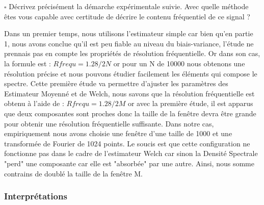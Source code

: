 \documentclass{article}
\newcommand{\finrep}{\vspace*{5mm}\hfill $\square$\color{black}\vspace*{5mm}}
\begin{document}
\finrep
\newpage
Décrivez précisément la démarche expérimentale suivie. Avec quelle méthode êtes vous capable avec certitude de décrire le contenu fréquentiel de ce signal ?\newline

Dans un premier temps, nous utilisons l'estimateur simple car bien qu'en partie 1, nous avons conclue qu'il est peu fiable au niveau du biais-variance, l'étude ne prennais pas en compte les propriétés de résolution fréquentielle. Or dans son cas, la formule est : $ Rfrequ = 1.28/2N $ or pour un N de 10000 nous obtenons une résolution précise et nous pouvons étudier facilement les éléments qui compose le spectre. \newline
Cette première étude va permettre d'ajuster les paramètres des Estimateur Moyenné et de Welch, nous savons que la résolution fréquentielle est obtenu à l'aide de : $ Rfrequ = 1.28/2M $ or avec la première étude, il est apparus que deux composantes sont proches donc la taille de la fenêtre devra être grande pour obtenir une résolution fréquentielle suffisante.\newline
Dans notre cas, empiriquement nous avons choisie une fenêtre d'une taille de 1000 et une transformée de Fourier de 1024 points. \newline
Le soucis est que cette configuration ne fonctionne pas dans le cadre de l'estimateur Welch car sinon la Densité Spectrale "perd" une composante car elle est "absorbée" par une autre. Ainsi, nous somme contrains de doublé la taille de la fenêtre M.

\subsubsection{Interprétations}
\end{document}
